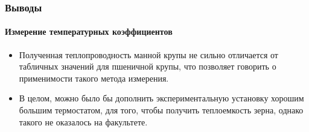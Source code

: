 \documentclass[8pt,pdf,hyperref={unicode}]{beamer}
\begin{document}
	\begin{frame}
		\frametitle{Выводы}
		\framesubtitle{Измерение температурных коэффициентов}
		\begin{center}
			\begin{itemize}
				\item Полученная теплопроводность манной крупы не сильно отличается от табличных значений для пшеничной крупы, что позволяет говорить о применимости такого метода измерения.
				\item В целом, можно было бы дополнить экспериментальную установку хорошим большим термостатом, для того, чтобы получить теплоемкость зерна, однако такого не оказалось на факультете.
			\end{itemize}		
		\end{center}
	\end{frame}
\end{document}
